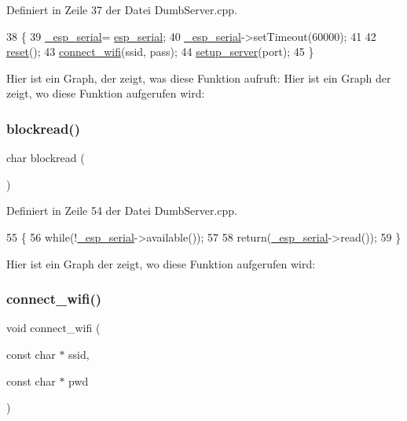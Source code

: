 Definiert in Zeile 37 der Datei Dumb\+Server.\+cpp.


\begin{DoxyCode}
38 \{
39   \hyperlink{classEspServer_a552aab874ad99b696f4c997d6f5a4746}{\_esp\_serial}= \hyperlink{Arduino__kommentiert_8ino_af690b3a6882292855c4091ede8039998}{esp\_serial};
40   \hyperlink{classEspServer_a552aab874ad99b696f4c997d6f5a4746}{\_esp\_serial}->setTimeout(60000);
41 
42   \hyperlink{classEspServer_ad20897c5c8bd47f5d4005989bead0e55}{reset}();
43   \hyperlink{classEspServer_a504393c8aa6394b2d0631146425bf011}{connect\_wifi}(ssid, pass);
44   \hyperlink{classEspServer_a7968cc44a6c9fff24b9020e1714c49f8}{setup\_server}(port);
45 \}
\end{DoxyCode}
Hier ist ein Graph, der zeigt, was diese Funktion aufruft\+:
Hier ist ein Graph der zeigt, wo diese Funktion aufgerufen wird\+:
\mbox{\label{classEspServer_ac2b4ae3c7ebcd751c4c8020412fa3270}} 
\subsubsection{\texorpdfstring{blockread()}{blockread()}}
{\footnotesize\ttfamily char blockread (\begin{DoxyParamCaption}{ }\end{DoxyParamCaption})\hspace{0.3cm}{\ttfamily [private]}}



Definiert in Zeile 54 der Datei Dumb\+Server.\+cpp.


\begin{DoxyCode}
55 \{
56   \textcolor{keywordflow}{while}(!\hyperlink{classEspServer_a552aab874ad99b696f4c997d6f5a4746}{\_esp\_serial}->available());
57 
58   \textcolor{keywordflow}{return}(\hyperlink{classEspServer_a552aab874ad99b696f4c997d6f5a4746}{\_esp\_serial}->read());
59 \}
\end{DoxyCode}
Hier ist ein Graph der zeigt, wo diese Funktion aufgerufen wird\+:
\mbox{\label{classEspServer_a504393c8aa6394b2d0631146425bf011}} 
\subsubsection{\texorpdfstring{connect\+\_\+wifi()}{connect\_wifi()}}
{\footnotesize\ttfamily void connect\+\_\+wifi (\begin{DoxyParamCaption}\item[{const char $\ast$}]{ssid,  }\item[{const char $\ast$}]{pwd }\end{DoxyParamCaption})\hspace{0.3cm}{\ttfamily [private]}}



